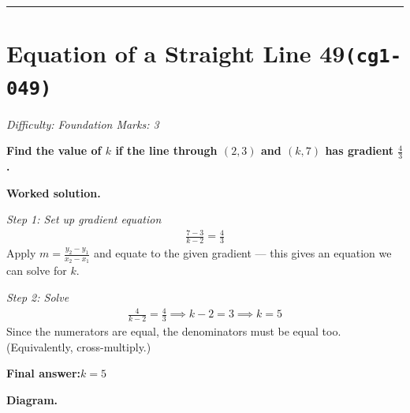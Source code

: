\documentclass[11pt]{article}
\newcommand{\question}[1]{\par\medskip\noindent\textbf{#1}\par}
\begin{document}
\medskip\hrule

\section*{Equation of a Straight Line 49\quad\small\texttt{(cg1-049)}}
\textit{Difficulty: Foundation \quad\textbar\quad Marks: 3}

\question{Find the value of \( k \) if the line through \( (2, 3) \) and \( (k, 7) \) has gradient \( \frac{4}{3} \).}

\textbf{Worked solution.}

\textit{Step 1: Set up gradient equation}
\[\begin{gathered}
\frac{7-3}{k-2} = \frac{4}{3}
\end{gathered}\]
Apply \(m = \frac{y_2 - y_1}{x_2 - x_1}\) and equate to the given gradient --- this gives an equation we can solve for \(k\).

\textit{Step 2: Solve}
\[\begin{gathered}
\frac{4}{k-2} = \frac{4}{3} \implies k - 2 = 3 \implies k = 5
\end{gathered}\]
Since the numerators are equal, the denominators must be equal too. (Equivalently, cross-multiply.)

\begin{answerbox}
\textbf{Final answer:}\quad \(\displaystyle k = 5\)
\end{answerbox}
\textbf{Diagram.}
\end{document}
